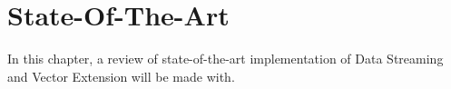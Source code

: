 
\chapter{State-Of-The-Art}
\label{chapter:state_art}
In this chapter, a review of state-of-the-art implementation of Data Streaming and Vector Extension will be made with.









